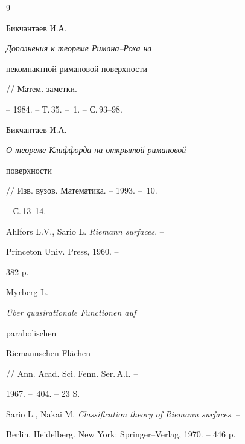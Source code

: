 \begin{thebibliography}{9}




Бикчантаев И.А. {\em Дополнения к теореме Римана--Роха на


некомпактной римановой поверхности} // Матем. заметки.


-- 1984. -- Т.\,35. -- \No\,1. -- С.\,93--98.




Бикчантаев И.А. {\em О теореме Клиффорда на открытой римановой


поверхности} // Изв. вузов. Математика. -- 1993. -- \No\,10.


-- С.\,13--14.




Ahlfors L.V., Sario L. {\em Riemann surfaces}. --


Princeton Univ. Press, 1960. --


382 p.




Myrberg L. {\em \"Uber quasirationale Functionen auf


parabolischen


Riemannschen Fl\"achen} // Ann. Acad. Sci. Fenn. Ser.\,A.I. --


1967. -- \No\,404. -- 23 S.




Sario L., Nakai M. {\em Classification theory of Riemann surfaces}. --


Berlin. Heidelberg. New York: Springer--Verlag, 1970. -- 446 p.





\end{thebibliography}


\vskip 2cm












\label{end}














